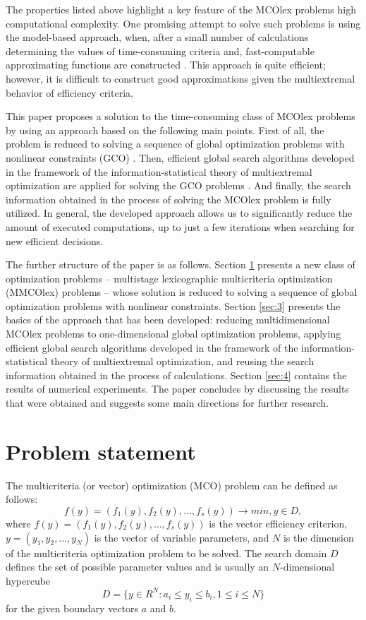 \documentclass[smallextended]{svjour3}       %
\begin{document}
The properties listed above highlight a key feature of the MCOlex problems   high computational complexity. One promising attempt to solve such problems is using the model-based approach, when, after a small number of calculations determining the values of time-consuming criteria and, fast-computable approximating functions are constructed \cite{c15,c16}. This approach is quite efficient; however, it is difficult to construct good approximations given the multiextremal behavior of efficiency criteria.

This paper proposes a solution to the time-consuming class of MCOlex problems by using an approach based on the following main points. First of all, the problem is reduced to solving a sequence of global optimization problems with nonlinear constraints (GCO) \cite{c2,c14}. Then, efficient global search algorithms developed in the framework of the information-statistical theory of multiextremal optimization are applied for solving the GCO problems \cite{c17,c18}. And finally, the search information obtained in the process of solving the MCOlex problem is fully utilized. In general, the developed approach allows us to significantly reduce the amount of executed computations, up to just a few iterations when searching for new efficient decisions.

The further structure of the paper is as follows. Section \ref{sec:2} presents a new class of optimization problems -- multistage lexicographic multicriteria optimization (MMCOlex) problems -- whose solution is reduced to solving a sequence of global optimization problems with nonlinear constraints. Section \ref{sec:3} presents the basics of the approach that has been developed: reducing multidimensional MCOlex problems to one-dimensional global optimization problems, applying efficient global search algorithms developed in the framework of the information-statistical theory of multiextremal optimization, and reusing the search information obtained in the process of calculations. Section \ref{sec:4} contains the results of numerical experiments. The paper concludes by discussing the results that were obtained and suggests some main directions for further research.

\section{Problem statement}
\label{sec:2}

The multicriteria (or vector) optimization (MCO) problem can be defined as follows:
\begin{equation}\label{eq:1}
f(y) = (f_1(y), f_2(y), \dots , f_s(y)) \to min,  y \in D,
\end{equation}
where $f(y) = (f_1(y), f_2(y), \dots , f_s(y))$ is the vector efficiency criterion, $y = (y_1, y_2, \dots , y_N)$ is the vector of variable parameters, and $N$ is the dimension of the multicriteria optimization problem to be solved. The search domain $D$ defines the set of possible parameter values and is usually an $N$-dimensional hypercube
\begin{equation}\label{eq:2}
D  = \{ y\in R^N: a_i \leq y_i \leq b_i, 1 \leq i \leq N \}
\end{equation}
for the given boundary vectors $a$ and $b$.
\end{document}
